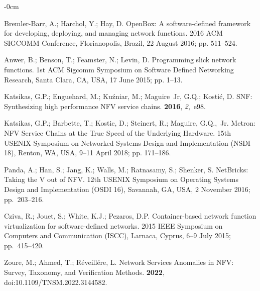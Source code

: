 \documentclass[futureinternet,review,accept,pdftex,moreauthors]{Definitions/mdpi}
\begin{document}
\begin{adjustwidth}{-\extralength}{0cm}
\begin{thebibliography}{999}
Bremler-Barr, A.; Harchol, Y.; Hay, D.
\newblock OpenBox: A software-defined framework for developing, deploying, and
  managing network functions.
 2016 ACM SIGCOMM Conference,  Florianopolis, Brazil, 22 August 2016; pp. 511--524.

Anwer, B.; Benson, T.; Feamster, N.; Levin, D.
\newblock Programming slick network functions.
 1st ACM Sigcomm Symposium on Software Defined
  Networking Research,  Santa Clara, CA, USA, 17 June 2015; pp. 1--13.

Katsikas, G.P.; Enguehard, M.; Ku{\'z}niar, M.; Maguire~Jr, G.Q.; Kosti{\'c},
  D.
\newblock SNF: Synthesizing high performance NFV service chains.
 {\bf 2016}, {\em 2},~e98.

Katsikas, G.P.; Barbette, T.; Kostic, D.; Steinert, R.; Maguire, G.Q.,~Jr.
\newblock Metron: NFV Service Chains at the True Speed of the Underlying
  Hardware.
 15th USENIX Symposium on Networked Systems Design and
  Implementation (NSDI 18),  Renton, WA, USA, 9--11 April 2018; pp. 171--186.

Panda, A.; Han, S.; Jang, K.; Walls, M.; Ratnasamy, S.; Shenker, S.
\newblock NetBricks: Taking the V out of NFV.
 12th USENIX Symposium on Operating Systems Design and
  Implementation (OSDI 16),  Savannah, GA, USA, 2 November 2016; \mbox{pp. 203--216.}

Cziva, R.; Jouet, S.; White, K.J.; Pezaros, D.P.
\newblock Container-based network function virtualization for software-defined
  networks.
 2015 IEEE Symposium on Computers and Communication (ISCC), Larnaca, Cyprus, 6--9 July  2015; \mbox{pp. 415--420.}

Zoure, M.; Ahmed, T.; R{\'e}veill{\'e}re, L.
\newblock Network Services Anomalies in NFV: Survey, Taxonomy, and Verification
  Methods.
 {\bf 2022}, {doi:10.1109/TNSM.2022.3144582.} %



\end{thebibliography}
\end{adjustwidth}
\end{document}
